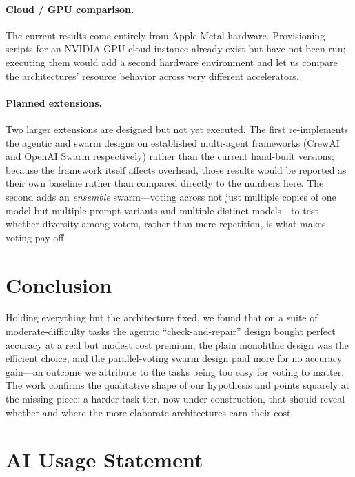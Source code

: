\documentclass[sigconf,nonacm]{acmart}
\begin{document}
\paragraph{Cloud / GPU comparison.} The current results come entirely from Apple
Metal hardware. Provisioning scripts for an NVIDIA GPU cloud instance already
exist but have not been run; executing them would add a second hardware
environment and let us compare the architectures' resource behavior across very
different accelerators.

\paragraph{Planned extensions.} Two larger extensions are designed but not yet
executed. The first re-implements the agentic and swarm designs on established
multi-agent frameworks (CrewAI and OpenAI Swarm respectively) rather than the
current hand-built versions; because the framework itself affects overhead, those
results would be reported as their own baseline rather than compared directly to
the numbers here. The second adds an \emph{ensemble} swarm---voting across not
just multiple copies of one model but multiple prompt variants and multiple
distinct models---to test whether diversity among voters, rather than mere
repetition, is what makes voting pay off.

\section{Conclusion}
\label{sec:conclusion}

Holding everything but the architecture fixed, we found that on a suite of
moderate-difficulty tasks the agentic ``check-and-repair'' design bought perfect
accuracy at a real but modest cost premium, the plain monolithic design was the
efficient choice, and the parallel-voting swarm design paid more for no accuracy
gain---an outcome we attribute to the tasks being too easy for voting to matter.
The work confirms the qualitative shape of our hypothesis and points squarely at
the missing piece: a harder task tier, now under construction, that should reveal
whether and where the more elaborate architectures earn their cost.

\section*{AI Usage Statement}
\end{document}

